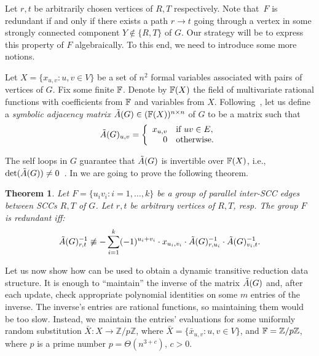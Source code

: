 \documentclass[11pt]{article}
\newtheorem{theorem}{Theorem}[section]
\begin{document}
{Let $r,t$ be arbitrarily chosen vertices of $R,T$ respectively.
Note that~$F$ is redundant if and only if there exists
a path $r\to t$ going through a vertex in some strongly connected component $Y\notin \{R,T\}$ of $G$.
Our strategy will be to express this property of $F$ algebraically.
To this end, we need to introduce some more notions.

Let $X=\{x_{u,v}:u,v\in V\}$ be a set of $n^2$ formal variables associated with
pairs of vertices of $G$.
Fix some finite $\mathbb{F}$. Denote by $\mathbb{F}(X)$ the field of multivariate rational functions
with coefficients from $\mathbb{F}$ and variables from $X$.
Following~\cite{Sankowski04}, let us define a \emph{symbolic adjacency matrix} $\tilde{A}(G)\in (\mathbb{F}(X))^{n\times n}$ of $G$
to be a matrix such
that
\begin{equation*}
\tilde{A}(G)_{u,v} =
 \left\{
 \begin{array}{rl}
   x_{u,v} & \textrm{if  } uv \in E, \\
 0 & \textrm{otherwise.}
\end{array}
\right.
\end{equation*}


The self loops in $G$ guarantee that $\tilde{A}(G)$ is invertible over $\mathbb{F}(X)$, i.e., $\det(\tilde{A}(G))\neq 0$~\cite{Sankowski04}.
In  we are going to prove the following theorem.
\begin{theorem}\label{t:tr-matrix}
Let $F=\{u_iv_i:i=1,\ldots,k\}$ be a group of parallel inter-SCC edges between SCCs $R,T$ of $G$.
Let $r,t$ be arbitrary vertices of $R,T$, resp.
  The group $F$ is redundant iff:
\begin{align*}
  \tilde{A}(G)^{-1}_{r,t}\not\equiv-\sum_{i=1}^k (-1)^{u_i+v_i}\cdot x_{u_i,v_i}\cdot \tilde{A}(G)^{-1}_{r,u_i}\cdot \tilde{A}(G)^{-1}_{v_i,t}.
\end{align*}
\end{theorem}
Let us now show how  can be used to obtain a dynamic transitive reduction data structure.
It is enough to ``maintain'' the inverse
of the matrix $\tilde{A}(G)$ and, after each update, check appropriate polynomial identities
on some $m$ entries of the inverse.
The inverse's entries are rational functions, so maintaining them would be too slow.
Instead, we
maintain the entries' evaluations for
some uniformly random substitution 
$\bar{X}:X\to \mathbb{Z}/p\mathbb{Z}$, where $\bar{X}=\{\bar{x}_{u,v}:u,v\in V\}$,
and $\mathbb{F}=\mathbb{Z}/p\mathbb{Z}$,
where $p$ is a prime number $p=\Theta(n^{3+c})$, $c>0$.

}
\end{document}
